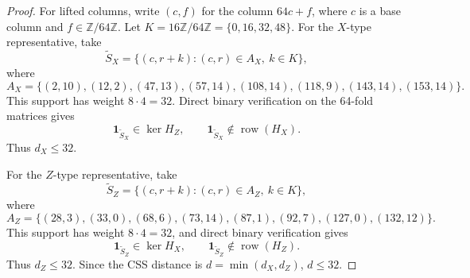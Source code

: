 \documentclass[10pt,a4paper]{amsart}
\newcommand{\HX}{H_X}
\newcommand{\HZ}{H_Z}
\newcommand{\kerop}{\operatorname{ker}}
\newcommand{\row}{\operatorname{row}}
\newcommand{\vect}[1]{\bm{#1}}
\begin{document}
\begin{proof}
For lifted columns, write \((c,f)\) for the column \(64c+f\), where \(c\) is a base column and \(f\in\mathbb Z/64\mathbb Z\).
Let \(K=16\mathbb Z/64\mathbb Z=\{0,16,32,48\}\).
For the \(X\)-type representative, take
\[
  \widetilde S_X
  =
  \{(c,r+k): (c,r)\in A_X,\ k\in K\},
\]
where
\[
  A_X=\{(2,10),(12,2),(47,13),(57,14),(108,14),(118,9),(143,14),(153,14)\}.
\]
This support has weight \(8\cdot4=32\).
Direct binary verification on the 64-fold matrices gives
\[
  \vect{1}_{\widetilde S_X}\in\kerop \HZ,
  \qquad
  \vect{1}_{\widetilde S_X}\notin \row(\HX).
\]
Thus \(d_X\le32\).

For the \(Z\)-type representative, take
\[
  \widetilde S_Z
  =
  \{(c,r+k): (c,r)\in A_Z,\ k\in K\},
\]
where
\[
  A_Z=\{(28,3),(33,0),(68,6),(73,14),(87,1),(92,7),(127,0),(132,12)\}.
\]
This support has weight \(8\cdot4=32\), and direct binary verification gives
\[
  \vect{1}_{\widetilde S_Z}\in\kerop \HX,
  \qquad
  \vect{1}_{\widetilde S_Z}\notin \row(\HZ).
\]
Thus \(d_Z\le32\).
Since the CSS distance is \(d=\min(d_X,d_Z)\), \(d\le32\).
\end{proof}
\end{document}
